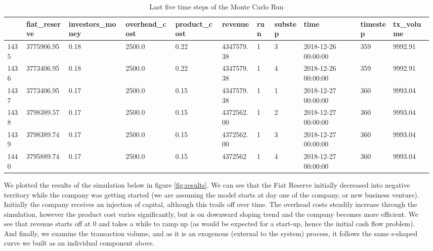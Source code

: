 \documentclass[12pt]{extarticle}
\begin{document}
\begin{table}[h]
 \centering
\begin{adjustbox}{max width=\textwidth}
\begin{tabular}{@{}lllllllllll@{}}
\toprule
     & fiat\_reserve      & investors\_money    & overhead\_cost & product\_cost       & revenue           & run & substep & time                & timestep & tx\_volume        \\ \midrule
1435 & 3775906.95 & 0.18  & 2500.0         & 0.22 & 4347579.38  & 1   & 3       & 2018-12-26 00:00:00 & 359      & 9992.91 \\
1436 & 3773406.95 & 0.18  & 2500.0         & 0.22 & 4347579.38  & 1   & 4       & 2018-12-26 00:00:00 & 359      & 9992.91 \\
1437 & 3773406.95 & 0.17 & 2500.0         & 0.15 & 4347579.38  & 1   & 1       & 2018-12-27 00:00:00 & 360      & 9993.04 \\
1438 & 3798389.57 & 0.17 & 2500.0         & 0.15 & 4372562.00 & 1   & 2       & 2018-12-27 00:00:00 & 360      & 9993.04 \\
1439 & 3798389.74 & 0.17 & 2500.0         & 0.15 & 4372562.00 & 1   & 3       & 2018-12-27 00:00:00 & 360      & 9993.04 \\
1440 & 3795889.74 & 0.17 & 2500.0         & 0.15 & 4372562 & 1   & 4       & 2018-12-27 00:00:00 & 360      & 9993.04 \\ \bottomrule
\end{tabular}
\end{adjustbox}
\caption{Last five time steps of the Monte Carlo Run}
\label{table:LastFive}
\end{table}

We plotted the results of the simulation below in figure \ref{fig:results}. We can see that the Fiat Reserve initially decreased into negative territory while the company was getting started (we are assuming the model starts at day one of the company, or new business venture). Initially the company receives an injection of capital, although this trails off over time. The overhead costs steadily increase through the simulation, however the product cost varies significantly, but is on downward sloping trend and the company becomes more efficient. We see that revenue starts off at 0 and takes a while to ramp up (as would be expected for a start-up, hence the initial cash flow problem). And finally, we examine the transaction volume, and as it is an exogenous (external to the system) process, it follows the same s-shaped curve we built as an individual component above. 
\newpage
\end{document}
